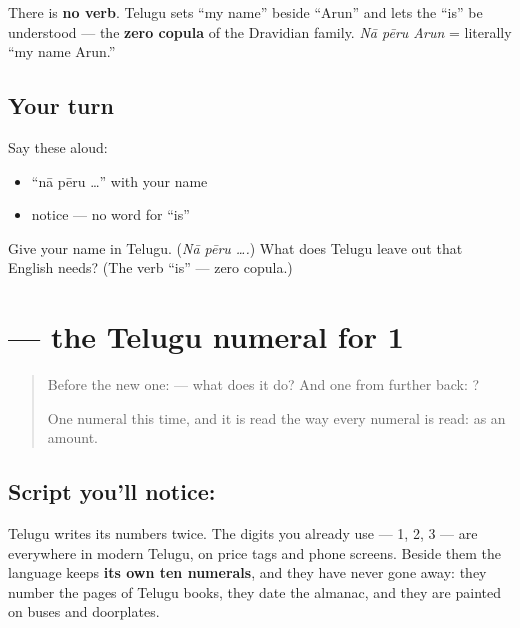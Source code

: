 \begin{grammarlens}[title={Grammar Lens: the zero copula}]
There is \textbf{no verb}. Telugu sets \textquotedblleft{}my name\textquotedblright{} beside \textquotedblleft{}Arun\textquotedblright{} and lets the \textquotedblleft{}is\textquotedblright{} be understood — the \textbf{zero copula} of the Dravidian family. \emph{Nā pēru Arun} = literally \textquotedblleft{}my name Arun.\textquotedblright{}
\end{grammarlens}

\subsection*{Your turn}
Say these aloud:

\begin{itemize}
\raggedright
  \item \textquotedblleft{}nā pēru …\textquotedblright{} with your name
  \item notice — no word for \textquotedblleft{}is\textquotedblright{}
\end{itemize}

\begin{tcolorbox}[breakable,colback=teal!4,colframe=teal!35!black,title={Before you move on}]
Give your name in Telugu. (\emph{Nā pēru ….}) What does Telugu leave out that English needs? (The verb \textquotedblleft{}is\textquotedblright{} — zero copula.)
\end{tcolorbox}
\section[\texorpdfstring{\te{౧} (1)}{౧ (1)}]{ — the Telugu numeral for 1}

\label{lesson:TE-S140-digit-1}



\begin{quote}
Before the new one:  — what does it do? And one from further back: ?

One numeral this time, and it is read the way every numeral is read: as an amount.
\end{quote}

\subsection*{Script you'll notice: }
Telugu writes its numbers twice. The digits you already use — 1, 2, 3 — are everywhere in modern Telugu, on price tags and phone screens. Beside them the language keeps \textbf{its own ten numerals}, and they have never gone away: they number the pages of Telugu books, they date the almanac, and they are painted on buses and doorplates.

